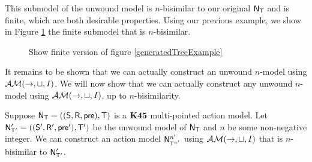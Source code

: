 This submodel of the unwound model is $n$-bisimilar to our original $\mathrm{\mathsf{N}}_\mathrm{\mathsf{T}}$
and is finite, which are both desirable properties.
Using our previous example, we show in Figure \ref{genSubtreeExample} the
finite submodel that is $n$-bisimilar.

\begin{figure}
\centering
\caption[Example of unwound $n$-model]{\FIXME Show finite version of figure \ref{generatedTreeExample}} \label{genSubtreeExample}
\end{figure}

It remains to be shown that we can actually construct an unwound $n$-model using
$\mathcal{AM}(\to,\sqcup,I)$.
We will now show that we can actually construct any unwound $n$-model using $\mathcal{AM}(\to,
\sqcup, I)$, up to $n$-bisimilarity.

\begin{lemma} \label{lemma:unwoundModelBisimilarConstruct}
  Suppose $\mathrm{\mathsf{N}}_\mathrm{\mathsf{T}} = ((\mathrm{\mathsf{S}},\mathrm{\mathsf{R}},\mathrm{\mathsf{pre}}),\mathrm{\mathsf{T}})$ is a $\bf K45$ multi-pointed
  action model.
	Let $\mathrm{\mathsf{N}}'_{\mathrm{\mathsf{T}}'} = ((\mathrm{\mathsf{S}}',\mathrm{\mathsf{R}}',\mathrm{\mathsf{pre}}'),\mathrm{\mathsf{T}}')$ be the unwound model of
  $\mathrm{\mathsf{N}}_\mathrm{\mathsf{T}}$ and $n$ be some non-negative integer.
	We can construct an action model $\mathrm{\mathsf{N}}^{n'}_{\mathrm{\mathsf{T}}^{n'}}$ using $\mathcal{AM}(\to,\sqcup,I)$ that is $n$-bisimilar to
  $\mathrm{\mathsf{N}}'_{\mathrm{\mathsf{T}}'}$.
\end{lemma}
